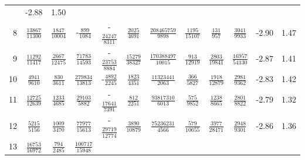 \documentclass[letterpaper,11pt,nointlimits,reqno,draft]{amsbook}
\begin{document}
\begin{table}
\begin{tabular}{r|ccccccccc|c@{ -- }c@{\%}}
&  -2.88 &  1.50
\\
8
&  $\frac{           13867}{           11300}$
&  $\frac{            1847}{           10004}$
& -$\frac{             899}{            1084}$
& -$\frac{           24247}{            8311}$
&  $\frac{            2025}{            4691}$
&  $\frac{       208465759}{            9898}$
&  $\frac{            1195}{           15107}$
&  $\frac{             131}{             957}$
&  $\frac{            3041}{            9933}$
&  -2.90 &  1.47
\\
9
&  $\frac{           11292}{           11417}$
&  $\frac{            2667}{           12475}$
&  $\frac{           71783}{           14593}$
& -$\frac{           23753}{            8884}$
&  $\frac{           15279}{           38327}$
&  $\frac{       170388497}{           10015}$
&  $\frac{             913}{           12919}$
&  $\frac{            2803}{           19841}$
&  $\frac{           16957}{           54130}$
&  -2.87 &  1.41
\\
10
&  $\frac{            4941}{            9610}$
&  $\frac{             830}{            3611}$
&  $\frac{          279834}{           13813}$
& -$\frac{            4892}{            2245}$
&  $\frac{            1823}{            4351}$
&  $\frac{        11323441}{            2063}$
&  $\frac{             366}{            5827}$
&  $\frac{            1918}{           12879}$
&  $\frac{            2981}{            9362}$
&  -2.83 &  1.42
\\
11
&  $\frac{           12725}{           12639}$
&  $\frac{            1233}{            4685}$
&  $\frac{           29103}{            5882}$
& -$\frac{           17641}{            7391}$
&  $\frac{             812}{            2251}$
&  $\frac{        93817310}{            6013}$
&  $\frac{             575}{            9852}$
&  $\frac{            1238}{            8665}$
&  $\frac{            2801}{            8822}$
&  -2.79 &  1.32
\\
12
&  $\frac{            5215}{            5156}$
&  $\frac{            1009}{            3470}$
&  $\frac{           77977}{           15613}$
& -$\frac{           29719}{           12774}$
&  $\frac{            3890}{           10879}$
&  $\frac{        75236231}{            4566}$
&  $\frac{             579}{           10655}$
&  $\frac{            3977}{           28471}$
&  $\frac{            2948}{            9301}$
&  -2.86 &  1.36
\\
13
&  $\frac{           16753}{           16972}$
&  $\frac{             794}{            2485}$
&  $\frac{          100717}{           15948}$

\end{tabular}
\end{table}
\end{document}
